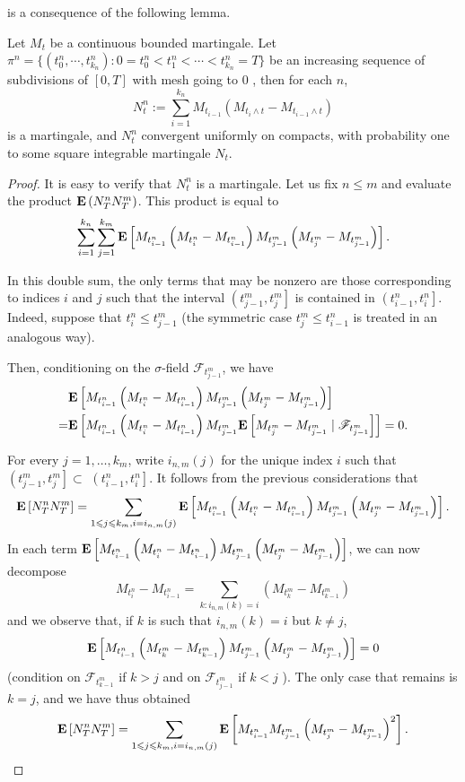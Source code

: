  is a consequence of the following lemma. 
	\begin{lemma}
		Let $M_t$ be a continuous bounded martingale.  Let $\pi^n=\{(t_0^n,\cdots, t_{k_n}^n): 0=t_0^n<t_1^n<\cdots<t_{k_n}^n=T\}$ be an increasing sequence of subdivisions of $[0, T]$ with mesh going to 0 , then for each $n$, 
		$$
		N^n_t:= \sum_{i=1}^{k_n}M_{t_{i-1}}(M_{t_i\wedge t}-M_{t_{i-1}\wedge t})
		$$ 
		is a martingale, and $N^n_t$ convergent uniformly on compacts, with probability one to some square integrable martingale $N_t$. 
	\end{lemma}
	\begin{proof}
		It is easy to verify that $N_t^n$ is a martingale. 
		Let us fix $n \leq m$ and evaluate the product ${\mathbf E}\left(N_T^n N_T^m\right)$. This product is equal to
		$$
		\sum_{i=1}^{k_n} \sum_{j=1}^{k_m} {\mathbf E}\left[M_{t_{i-1}^n}\left(M_{t_i^n}-M_{t_{i-1}^n}\right) M_{t_{j-1}^m}\left(M_{t_j^m}-M_{t_{j-1}^m}\right)\right] .
		$$
		
		In this double sum, the only terms that may be nonzero are those corresponding to indices $i$ and $j$ such that the interval $\left(t_{j-1}^m, t_j^m\right]$ is contained in $\left(t_{i-1}^n, t_i^n\right]$. Indeed, suppose that $t_i^n \leq t_{j-1}^m$ (the symmetric case $t_j^m \leq t_{i-1}^n$ is treated in an analogous way).
		
		Then, conditioning on the $\sigma$-field $\mathscr{F}_{t_{j-1}^m}$, we have
		$$
		\begin{aligned}
			& {\mathbf E}\left[M_{t_{i-1}^n}\left(M_{t_i^n}-M_{t_{i-1}^n}\right) M_{t_{j-1}^m}\left(M_{t_j^m}-M_{t_{j-1}^m}\right)\right] \\
		    =& {\mathbf E}\left[M_{t_{i-1}^n}\left(M_{t_i^n}-M_{t_{i-1}^n}\right) M_{t_{j-1}^m} {\mathbf E}\left[M_{t_j^m}-M_{t_{j-1}^m} \mid \mathscr{F}_{t_{j-1}^m}\right]\right]=0 .
		\end{aligned}
		$$
		
		For every $j=1, \ldots, k_m$, write $i_{n, m}(j)$ for the unique index $i$ such that $\left(t_{j-1}^m, t_j^m\right] \subset$ $\left(t_{i-1}^n, t_i^n\right]$. It follows from the previous considerations that
		$$
		{\mathbf E}\left[N_T^n N_T^m\right]=\sum_{1 \leqslant j \leqslant k_m, i=i_{n, m}(j)} {\mathbf E}\left[M_{t_{i-1}^n}\left(M_{t_i^n}-M_{t_{i-1}^n}\right) M_{t_{j-1}^m}\left(M_{t_j^m}-M_{t_{j-1}^m}\right)\right] .
		$$
		In each term ${\mathbf E}\left[M_{t_{i-1}^n}\left(M_{t_i^n}-M_{t_{i-1}^n}\right) M_{t_{j-1}^m}\left(M_{t_j^m}-M_{t_{j-1}^m}\right)\right]$, we can now decompose
		$$
		M_{t_i^n}-M_{t_{i-1}^n}=\sum_{k: i_{n, m}(k)=i}\left(M_{t_k^m}-M_{t_{k-1}^m}\right)
		$$
		and we observe that, if $k$ is such that $i_{n, m}(k)=i$ but $k \neq j$,
		$$
	    {\mathbf E}\left[M_{t_{i-1}^n}\left(M_{t_k^m}-M_{t_{k-1}^m}\right) M_{t_{j-1}^m}\left(M_{t_j^m}-M_{t_{j-1}^m}\right)\right]=0
		$$
		(condition on $\mathscr{F}_{t_{k-1}^m}$ if $k>j$ and on $\mathscr{F}_{t_{j-1}^m}$ if $k<j$ ). The only case that remains is $k=j$, and we have thus obtained
		$$
		{\mathbf E}\left[N_T^n N_T^m\right]=\sum_{1 \leqslant j \leqslant k_m, i=i_{n, m}(j)} {\mathbf E}\left[M_{t_{i-1}^n} M_{t_{j-1}^m}\left(M_{t_j^m}-M_{t_{j-1}^m}\right)^2\right] .
		$$
		

\end{proof}
